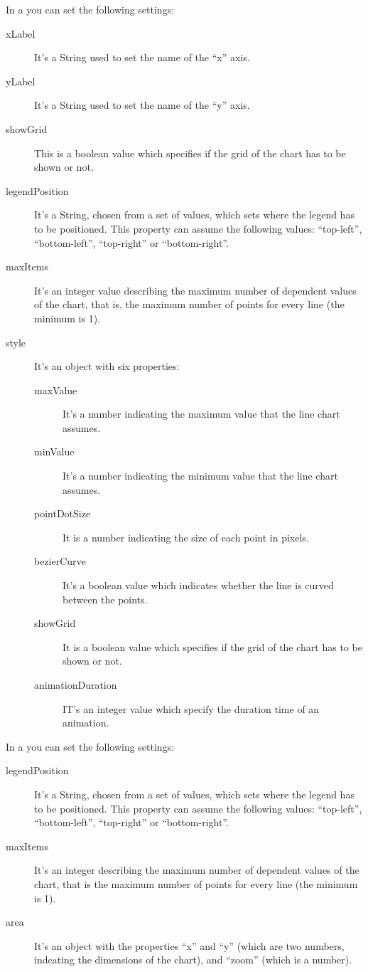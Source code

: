 				In a  you can set the following settings:
				\begin{description}
					\item[xLabel] It's a String used to set the name of the “x” axis.
					\item[yLabel] It's a String used to set the name of the “y” axis.
					\item[showGrid] This is a boolean value which specifies if the grid of the chart has to be shown or not.
					\item[legendPosition] It's a String, chosen from a set of values, which sets where the legend has to be positioned. This property can assume the following values: “top-left”, “bottom-left”, “top-right” or “bottom-right”.
					\item[maxItems] It's an integer value describing the maximum number of dependent values of the chart, that is, the maximum number of points for every line (the minimum is 1).
					\item[style] It's an object with six properties:
						\begin{description}
							\item[maxValue] It's a number indicating the maximum value that the line chart assumes.
							\item[minValue] It's a number indicating the minimum value that the line chart assumes.
							\item[pointDotSize] It is a number indicating the size of each point in pixels.
							\item[bezierCurve] It's a boolean value which indicates whether the line is curved between the points.
							\item[showGrid] It is a boolean value which specifies if the grid of the chart has to be shown or not.
							\item[animationDuration] IT's an integer value which specify the duration time of an animation.
						\end{description}
				\end{description}
				In a  you can set the following settings:
				\begin{description}
					\item[legendPosition] It's a String, chosen from a set of values, which sets where the legend has to be positioned. This property can assume the following values: “top-left”, “bottom-left”, “top-right” or “bottom-right”.
					\item[maxItems] It's an integer describing the maximum number of dependent values of the chart, that is the maximum number of points for every line (the minimum is 1).
					\item[area] It's an object with the properties “x” and “y” (which are two numbers, indcating the dimensions of the chart), and “zoom” (which is a number).
				\end{description}
